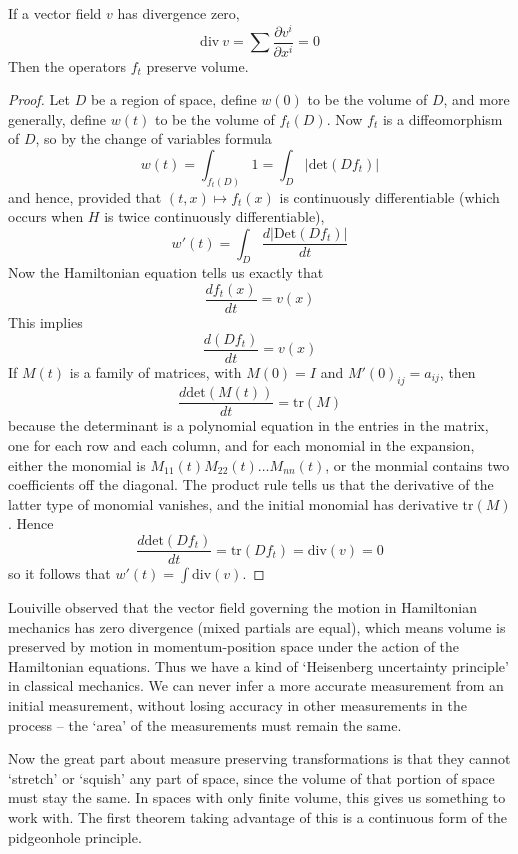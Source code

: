 \begin{lemma}
    If a vector field $v$ has divergence zero,
    \[ \text{div}\ v = \sum \frac{\partial v^i}{\partial x^i} = 0 \]
    Then the operators $f_t$ preserve volume.
\end{lemma}
\begin{proof}
    Let $D$ be a region of space, define $w(0)$ to be the volume of $D$, and more generally, define $w(t)$ to be the volume of $f_t(D)$. Now $f_t$ is a diffeomorphism of $D$, so by the change of variables formula
    \[ w(t) = \int_{f_t(D)} 1 = \int_{D} |\text{det} (Df_t) | \]
    and hence, provided that $(t,x) \mapsto f_t(x)$ is continuously differentiable (which occurs when $H$ is twice continuously differentiable),
    \[ w'(t) = \int_D \frac{d |\text{Det}(Df_t)|}{dt} \]
    Now the Hamiltonian equation tells us exactly that
    \[ \frac{df_t(x)}{dt} = v(x) \]
    This implies
    \[ \frac{d(Df_t)}{dt} = v(x) \]
    If $M(t)$ is a family of matrices, with $M(0) = I$ and $M'(0)_{ij} = a_{ij}$, then
    \[ \frac{d \text{det}(M(t))}{dt} = \text{tr}(M) \]
    because the determinant is a polynomial equation in the entries in the matrix, one for each row and each column, and for each monomial in the expansion, either the monomial is $M_{11}(t) M_{22}(t) \dots M_{nn}(t)$, or the monmial contains two coefficients off the diagonal. The product rule tells us that the derivative of the latter type of monomial vanishes, and the initial monomial has derivative $\text{tr}(M)$. Hence
    \[ \frac{d \text{det}(Df_t)}{dt} = \text{tr}(Df_t) = \text{div}(v) = 0 \]
    so it follows that $w'(t) = \int \text{div}(v)$.
\end{proof}

Louiville observed that the vector field governing the motion in Hamiltonian mechanics has zero divergence (mixed partials are equal), which means volume is preserved by motion in momentum-position space under the action of the Hamiltonian equations. Thus we have a kind of `Heisenberg uncertainty principle' in classical mechanics. We can never infer a more accurate measurement from an initial measurement, without losing accuracy in other measurements in the process -- the `area' of the measurements must remain the same.

Now the great part about measure preserving transformations is that they cannot `stretch' or `squish' any part of space, since the volume of that portion of space must stay the same. In spaces with only finite volume, this gives us something to work with. The first theorem taking advantage of this is a continuous form of the pidgeonhole principle.

